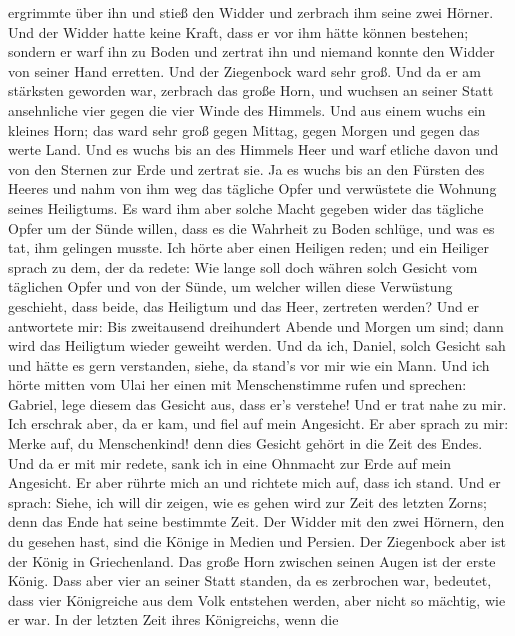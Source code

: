 ergrimmte über ihn und stieß den Widder und zerbrach ihm seine zwei
Hörner. Und der Widder hatte keine Kraft, dass er vor ihm hätte können
bestehen; sondern er warf ihn zu Boden und zertrat ihn und niemand
konnte den Widder von seiner Hand erretten.  Und der
Ziegenbock ward sehr groß. Und da er am stärksten geworden war, zerbrach
das große Horn, und wuchsen an seiner Statt ansehnliche vier gegen die
vier Winde des Himmels.  Und aus einem wuchs ein kleines
Horn; das ward sehr groß gegen Mittag, gegen Morgen und gegen das werte
Land.  Und es wuchs bis an des Himmels Heer und warf
etliche davon und von den Sternen zur Erde und zertrat sie.
 Ja es wuchs bis an den Fürsten des Heeres und nahm von ihm
weg das tägliche Opfer und verwüstete die Wohnung seines Heiligtums.
 Es ward ihm aber solche Macht gegeben wider das tägliche
Opfer um der Sünde willen, dass es die Wahrheit zu Boden schlüge, und
was es tat, ihm gelingen musste.  Ich hörte aber einen
Heiligen reden; und ein Heiliger sprach zu dem, der da redete: Wie lange
soll doch währen solch Gesicht vom täglichen Opfer und von der Sünde, um
welcher willen diese Verwüstung geschieht, dass beide, das Heiligtum und
das Heer, zertreten werden?  Und er antwortete mir: Bis
zweitausend dreihundert Abende und Morgen um sind; dann wird das
Heiligtum wieder geweiht werden.  Und da ich, Daniel, solch
Gesicht sah und hätte es gern verstanden, siehe, da stand's vor mir wie
ein Mann.  Und ich hörte mitten vom Ulai her einen mit
Menschenstimme rufen und sprechen: Gabriel, lege diesem das Gesicht aus,
dass er's verstehe!  Und er trat nahe zu mir. Ich erschrak
aber, da er kam, und fiel auf mein Angesicht. Er aber sprach zu mir:
Merke auf, du Menschenkind! denn dies Gesicht gehört in die Zeit des
Endes.  Und da er mit mir redete, sank ich in eine Ohnmacht
zur Erde auf mein Angesicht. Er aber rührte mich an und richtete mich
auf, dass ich stand.  Und er sprach: Siehe, ich will dir
zeigen, wie es gehen wird zur Zeit des letzten Zorns; denn das Ende hat
seine bestimmte Zeit.  Der Widder mit den zwei Hörnern, den
du gesehen hast, sind die Könige in Medien und Persien. 
Der Ziegenbock aber ist der König in Griechenland. Das große Horn
zwischen seinen Augen ist der erste König.  Dass aber vier
an seiner Statt standen, da es zerbrochen war, bedeutet, dass vier
Königreiche aus dem Volk entstehen werden, aber nicht so mächtig, wie er
war.  In der letzten Zeit ihres Königreichs, wenn die

